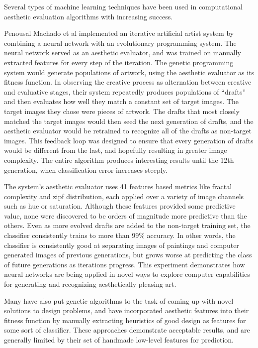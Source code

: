 \documentclass[midd]{thesis}
\begin{document}
Several types of machine learning techniques have been used in computational aesthetic evaluation algorithms with increasing success.

Penousal Machado et al \cite{machado2008experiments} implemented an iterative artificial artist system by combining a neural network with an evolutionary programming system. The neural network served as an aesthetic evaluator, and was trained on manually extracted features for every step of the iteration. The genetic programming system would generate populations of artwork, using the aesthetic evaluator as its fitness function. In observing the creative process as alternation between creative and evaluative stages, their system repeatedly produces populations of ``drafts'' and then evaluates how well they match a constant set of target images. The target images they chose were pieces of artwork. The drafts that most closely matched the target images would then seed the next generation of drafts, and the aesthetic evaluator would be retrained to recognize all of the drafts as non-target images. This feedback loop was designed to ensure that every generation of drafts would be different from the last, and hopefully resulting in greater image complexity. The entire algorithm produces interesting results until the 12th generation, when classification error increases steeply.

The system's aesthetic evaluator uses 41 features based metrics like fractal complexity and zipf distribution, each applied over a variety of image channels such as hue or saturation. Although these features provided some predictive value, none were discovered to be orders of magnitude more predictive than the others. Even as more evolved drafts are added to the non-target training set, the classifier consistently trains to more than 99\% accuracy. In other words, the classifier is consistently good at separating images of paintings and computer generated images of previous generations, but grows worse at predicting the class of future generations as iterations progress. This experiment demonstrates how neural networks are being applied in novel ways to explore computer capabilities for generating and recognizing aesthetically pleasing art. %

Many have also put genetic algorithms to the task of coming up with novel solutions to design problems, and have incorporated aesthetic features into their fitness function by manually extracting heuristics of good design as features for some sort of classifier. These approaches demonstrate acceptable results, and are generally limited by their set of handmade low-level features for prediction. %
\end{document}

